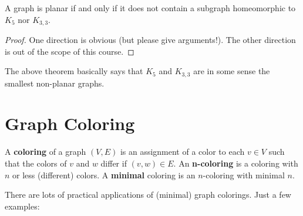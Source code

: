  \begin{theorem}
A graph is planar if and only if it does not contain a subgraph
homeomorphic to $K_{5}$ nor $K_{3,3}$.
\end{theorem}
\begin{proof}
One direction is obvious (but please give arguments!). The other direction
is out of the scope of this course.
\end{proof}

The above theorem basically says that $K_{5}$ and $K_{3,3}$ are in
some sense the smallest non-planar graphs.


\section{Graph Coloring}

 \begin{definition}
\textup{A \textbf{coloring} of a graph $(V,E)$ is an assignment of a
  color to each $v \in V$ such that the colors of $v$ and $w$ differ
  if $(v,w) \in E$. An
  \mbox{\textbf{n-coloring}} is a coloring with $n$ or less
  (different) colors. A \textbf{minimal} coloring is an $n$-coloring
  with minimal $n$.}
\end{definition}

There are lots of practical applications of (minimal) graph colorings.
Just a few examples:

